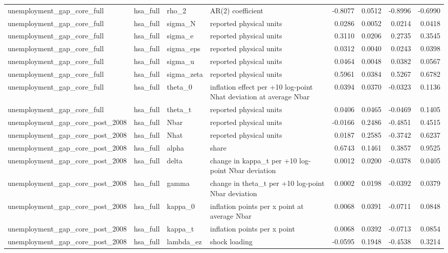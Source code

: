 \begin{tabular}{llllrrrr}
unemployment\_gap\_core\_full & hsa\_full & rho\_2 & AR(2) coefficient & -0.8077 & 0.0512 & -0.8996 & -0.6990 \\
unemployment\_gap\_core\_full & hsa\_full & sigma\_N & reported physical units & 0.0286 & 0.0052 & 0.0214 & 0.0418 \\
unemployment\_gap\_core\_full & hsa\_full & sigma\_e & reported physical units & 0.3110 & 0.0206 & 0.2735 & 0.3545 \\
unemployment\_gap\_core\_full & hsa\_full & sigma\_eps & reported physical units & 0.0312 & 0.0040 & 0.0243 & 0.0398 \\
unemployment\_gap\_core\_full & hsa\_full & sigma\_u & reported physical units & 0.0464 & 0.0048 & 0.0382 & 0.0567 \\
unemployment\_gap\_core\_full & hsa\_full & sigma\_zeta & reported physical units & 0.5961 & 0.0384 & 0.5267 & 0.6782 \\
unemployment\_gap\_core\_full & hsa\_full & theta\_0 & inflation effect per +10 log-point Nhat deviation at average Nbar & 0.0394 & 0.0370 & -0.0323 & 0.1136 \\
unemployment\_gap\_core\_full & hsa\_full & theta\_t & reported physical units & 0.0406 & 0.0465 & -0.0469 & 0.1405 \\
unemployment\_gap\_core\_post\_2008 & hsa\_full & Nbar & reported physical units & -0.0166 & 0.2486 & -0.4851 & 0.4515 \\
unemployment\_gap\_core\_post\_2008 & hsa\_full & Nhat & reported physical units & 0.0187 & 0.2585 & -0.3742 & 0.6237 \\
unemployment\_gap\_core\_post\_2008 & hsa\_full & alpha & share & 0.6743 & 0.1461 & 0.3857 & 0.9525 \\
unemployment\_gap\_core\_post\_2008 & hsa\_full & delta & change in kappa\_t per +10 log-point Nbar deviation & 0.0012 & 0.0200 & -0.0378 & 0.0405 \\
unemployment\_gap\_core\_post\_2008 & hsa\_full & gamma & change in theta\_t per +10 log-point Nbar deviation & 0.0002 & 0.0198 & -0.0392 & 0.0379 \\
unemployment\_gap\_core\_post\_2008 & hsa\_full & kappa\_0 & inflation points per x point at average Nbar & 0.0068 & 0.0391 & -0.0711 & 0.0848 \\
unemployment\_gap\_core\_post\_2008 & hsa\_full & kappa\_t & inflation points per x point & 0.0068 & 0.0392 & -0.0713 & 0.0854 \\
unemployment\_gap\_core\_post\_2008 & hsa\_full & lambda\_ez & shock loading & -0.0595 & 0.1948 & -0.4538 & 0.3214 \\

\end{tabular}
